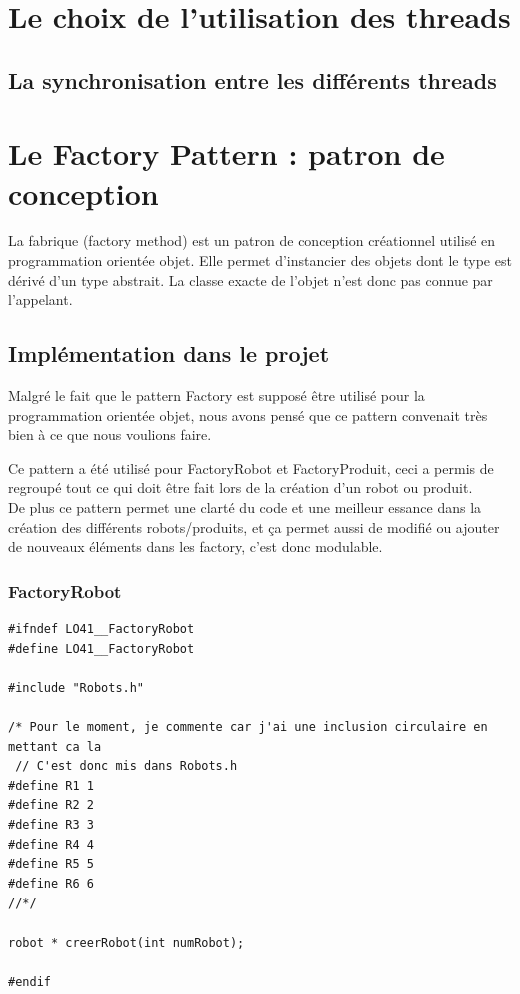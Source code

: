 \documentclass{report}
\begin{document}
\section{Le choix de l'utilisation des threads}
\subsection{La synchronisation entre les différents threads}
\section{Le Factory Pattern : patron de conception}
La fabrique (factory method) est un patron de conception créationnel utilisé en programmation orientée objet. Elle permet d'instancier des objets dont le type est dérivé d'un type abstrait. La classe exacte de l'objet n'est donc pas connue par l'appelant.
\subsection{Implémentation dans le projet}
Malgré le fait que le pattern Factory est supposé être utilisé pour la programmation orientée objet, nous avons pensé que ce pattern convenait très bien à ce que nous voulions faire.


Ce pattern a été utilisé pour FactoryRobot et FactoryProduit, ceci a permis de regroupé tout ce qui doit être fait lors de la création d'un robot ou produit.\\
De plus ce pattern permet une clarté du code et une meilleur essance dans la création des différents robots/produits, et ça permet aussi de modifié ou ajouter de nouveaux éléments dans les factory, c'est donc modulable.
\subsubsection{FactoryRobot}
\begin{lstlisting}[caption=Factory des robots]
#ifndef LO41__FactoryRobot
#define LO41__FactoryRobot

#include "Robots.h"

/* Pour le moment, je commente car j'ai une inclusion circulaire en mettant ca la
 // C'est donc mis dans Robots.h
#define R1 1
#define R2 2
#define R3 3
#define R4 4
#define R5 5
#define R6 6
//*/

robot * creerRobot(int numRobot);

#endif
\end{lstlisting}
\end{document}
